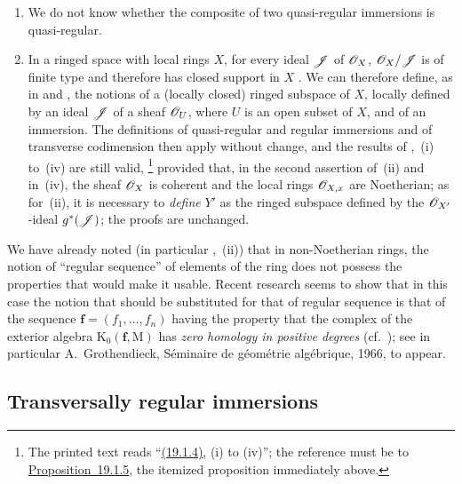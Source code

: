 \begin{remarks}[19.1.7]
\label{IV.19.1.7}
\medskip\noindent
\begin{enumerate}[label=(\roman*)]
  \item We do not know whether the composite of two quasi-regular immersions is quasi-regular.
  \item In a ringed space with local rings $X$, for every ideal $\mathscr{J}$ of $\mathscr{O}_X$, $\mathscr{O}_X/\mathscr{J}$ is of finite type and therefore has closed support in $X$ .
We can therefore define, as in  and , the notions of a (locally closed) ringed subspace of $X$, locally defined by an ideal $\mathscr{J}$ of a sheaf $\mathscr{O}_U$, where $U$ is an open subset of $X$, and of an immersion.
The definitions of quasi-regular and regular immersions and of transverse codimension then apply without change, and the results of ,~(i) to~(iv) are still valid,
\footnote{The printed text reads ``{\hyperref[IV.19.1.4]{(19.1.4)}}, (i) to (iv)''; the reference must be to {\hyperref[IV.19.1.5]{Proposition~19.1.5}}, the itemized proposition immediately above.}
provided that, in the second assertion of~(ii) and in~(iv), the sheaf $\mathscr{O}_X$ is coherent and the local rings $\mathscr{O}_{X,x}$ are Noetherian; as for~(ii), it is necessary to \emph{define} $Y'$ as the ringed subspace defined by the $\mathscr{O}_{X'}$-ideal $g^*(\mathscr{J})$; the proofs are unchanged.
\end{enumerate}
\end{remarks}

\begin{env}[19.1.8]
\label{IV.19.1.8}
We have already noted (in particular ,~(ii)) that in non-Noetherian rings, the notion of ``regular sequence'' of elements of the ring does not possess the properties that would make it usable.
Recent research seems to show that in this case the notion that should be substituted for that of regular sequence is that of the sequence $\mathbf{f}=(f_1,\ldots,f_n)$ having the property that the complex of the exterior algebra $\mathrm{K}_0(\mathbf{f},\mathrm{M})$  has \emph{zero homology in positive degrees} (cf.\ ); see in particular A.~Grothendieck, S\'eminaire de g\'eom\'etrie alg\'ebrique, 1966, to appear.
\end{env}

\subsection{Transversally regular immersions}
\label{subsection:IV.19.2}

